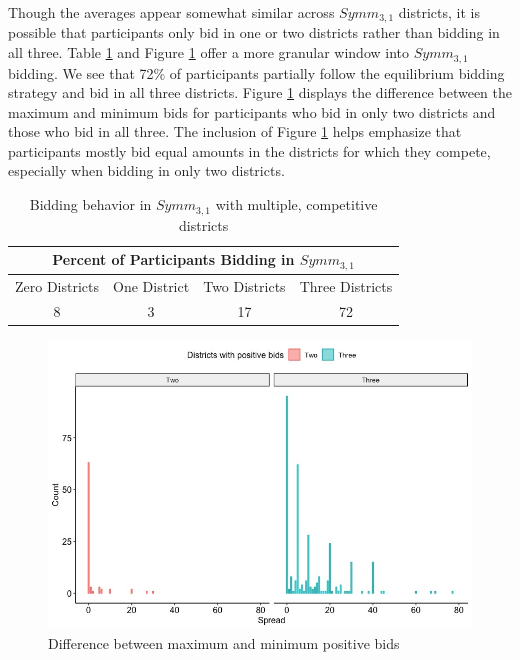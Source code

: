 \documentclass[AER]{AEA}
\begin{document}
Though the averages appear somewhat similar across $Symm_{3,1}$ districts, it is possible that participants only bid in one or two districts rather than bidding in all three. Table \ref{Tab:pct_bid_symm31} and Figure \ref{fig:unadjusted_spread} offer a more granular window into $Symm_{3,1}$ bidding. We see that 72\% of participants partially follow the equilibrium bidding strategy and bid in all three districts. Figure \ref{fig:unadjusted_spread} displays the difference between the maximum and minimum bids for participants who bid in only two districts and those who bid in all three. The inclusion of Figure \ref{fig:unadjusted_spread} helps emphasize that participants mostly bid equal amounts in the districts for which they compete, especially when bidding in only two districts.
\begin{table}
\begin{center}
 \begin{tabular}{|c c c c|} 
 \hline
 \multicolumn{4}{|c|}{ Percent of Participants Bidding in $Symm_{3,1}$} \\
 \hline
 Zero Districts & One District & Two Districts & Three Districts \\ [0.5ex] 
 \hline
 8 & 3 & 17 & 72 \\ 
 \hline
\end{tabular}
\caption{Bidding behavior in $Symm_{3,1}$ with multiple, competitive districts}
\label{Tab:pct_bid_symm31}
\end{center}
\end{table}

\begin{figure}[h]
\centering
\includegraphics[scale=0.3]{unadjusted_spread}
\caption{Difference between maximum and minimum positive bids}
\label{fig:unadjusted_spread}
\end{figure}
\end{document}
